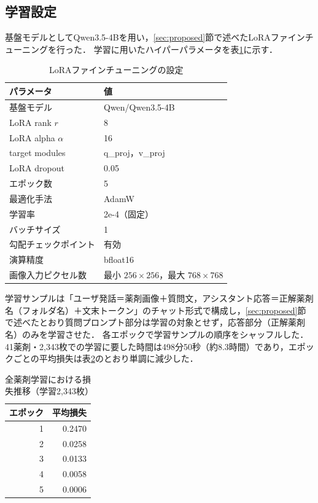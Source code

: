\documentclass[dvipdfmx]{jsarticle}
\begin{document}
\subsection{学習設定}

基盤モデルとしてQwen3.5-4Bを用い，\ref{sec:proposed}節で述べたLoRAファインチューニングを行った．
学習に用いたハイパーパラメータを表\ref{tab:lora_config}に示す．

\begin{table}[htbp]
\centering
\caption{LoRAファインチューニングの設定}
\label{tab:lora_config}
\begin{tabular}{ll}
\hline
パラメータ & 値 \\
\hline
基盤モデル & Qwen/Qwen3.5-4B \\
LoRA rank $r$ & 8 \\
LoRA alpha $\alpha$ & 16 \\
target modules & q\_proj，v\_proj \\
LoRA dropout & 0.05 \\
エポック数 & 5 \\
最適化手法 & AdamW \\
学習率 & 2e-4（固定） \\
バッチサイズ & 1 \\
勾配チェックポイント & 有効 \\
演算精度 & bfloat16 \\
画像入力ピクセル数 & 最小 $256 \times 256$，最大 $768 \times 768$ \\
\hline
\end{tabular}
\end{table}

学習サンプルは「ユーザ発話＝薬剤画像＋質問文，アシスタント応答＝正解薬剤名（フォルダ名）＋文末トークン」のチャット形式で構成し，\ref{sec:proposed}節で述べたとおり質問プロンプト部分は学習の対象とせず，応答部分（正解薬剤名）のみを学習させた．
各エポックで学習サンプルの順序をシャッフルした．
41薬剤・2,343枚での学習に要した時間は498分50秒（約8.3時間）であり，エポックごとの平均損失は表\ref{tab:loss_all}のとおり単調に減少した．

\begin{table}[htbp]
\centering
\caption{全薬剤学習における損失推移（学習2,343枚）}
\label{tab:loss_all}
\begin{tabular}{rr}
\hline
エポック & 平均損失 \\
\hline
1 & 0.2470 \\
2 & 0.0258 \\
3 & 0.0133 \\
4 & 0.0058 \\
5 & 0.0006 \\
\hline
\end{tabular}
\end{table}
\end{document}
